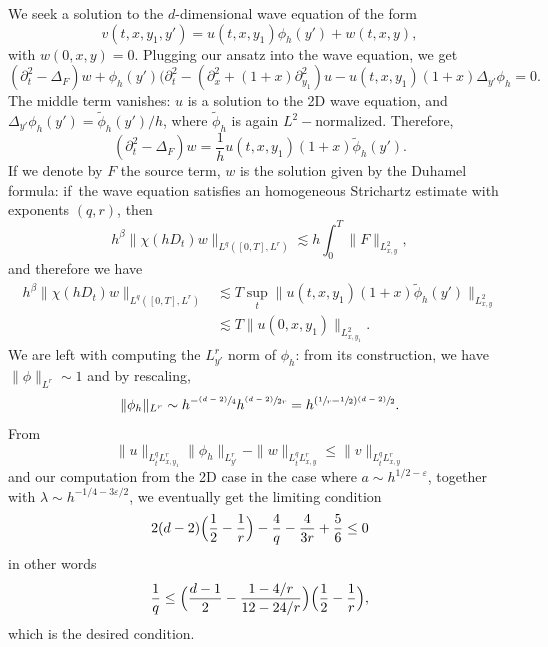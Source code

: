 \documentclass[11pt]{article}
\newcommand{\psfrac}[2]{\sfrac{(#1)}{#2}}
\theoremstyle{plain}
\theoremstyle{definition}
\begin{document}
We seek a solution to the $d$-dimensional wave equation of the form\vspace*{-3pt}
\[
v(t,x,y_{1},y')=u(t,x,y_{1}) \phi_{h}(y')+w(t,x,y),
\]
with $w(0,x,y)=0$. Plugging our ansatz into the wave equation, we get
\[
(\partial_{t}^{2} -\Delta_{F}) w+\phi_{h}(y')(\partial_{t}^{2} -(\partial_{x}^{2}+(1+x)\partial^{2}_{y_{1}}) u -u(t,x,y_{1}) (1+x)\Delta_{y'} \phi_{h}=0.
\]
The middle term vanishes: $u$ is a solution to the 2D wave equation, and $\Delta_{y'} \phi_{h}(y')= \tilde \phi_{h}(y') /h$, where $\tilde \phi_{h}$ is again $L^{2}-$normalized. Therefore,\vspace*{-3pt}
\[
(\partial_{t}^{2} -\Delta_{F}) w= \frac 1 h u(t,x,y_{1}) (1+x)\tilde \phi_{h}(y').
\]
If we denote by $F$ the source term, $w$ is the solution given by the Duhamel formula: if~the wave equation satisfies an homogeneous Strichartz estimate with exponents $(q,r)$, then\vspace*{-3pt}
\begin{equation*}\label{stricrdinhomo}
h^{\beta}\|\chi(hD_t)w\|_{L^q([0,T],
L^r)}\lesssim h \int_{0}^{T}\|F\|_{L^{2}_{x,y}},
\end{equation*}
and therefore we have
\begin{align*}
h^{\beta}\|\chi(hD_t)w\|_{L^q([0,T],
L^r)} & \lesssim T \sup_{t}\| u(t,x,y_{1}) (1+x)\tilde \phi_{h}(y')\|_{L^{2}_{x,y}}\\
& \lesssim T \| u(0,x,y_{1}) \|_{L^{2}_{x,y_{1}}}.
\end{align*}
We are left with computing the $L^{r}_{y'}$ norm of $ \phi_{h}$: from its construction, we have \hbox{$\|\phi\|_{L^{r}}\sim 1$} and by rescaling,
\[
\|\phi_h\|_{L^{r}}\sim h^{-\psfrac{d-2} 4} h^{\psfrac{d-2} {2r}}=h^{(\sfrac{1} {r}-\sfrac 1 2)\psfrac{d-2} 2}.
\]
From
\[
\|u\|_{L^{q}_{t}L^{r}_{x,y_{1}}} \|\phi_{h}\|_{L^{r}_{y'}} -\|w\|_{L^{q}_{t}L^{r}_{x,y}}\leq \|v\|_{L^{q}_{t}L^{r}_{x,y}}
\]
and our computation from the 2D case in the case where $a\sim h^{1/2-\varepsilon}$, together with $\lambda \sim h^{-1/4-3\varepsilon/2}$, we eventually get the limiting condition
\[
2(d-2)\Bigl(\frac 1 2-\frac 1 r\Bigr)- \frac 4{q}-\frac{4}{3r}+\frac 5 6\leq 0
\]
in other words
\[
\frac 1 q \leq \Bigl(\frac {d-1} 2 -\frac {1-4/r}{12-24/r}\Bigr) \Bigl(\frac 1 2 -\frac 1 r\Bigr),
\]
which is the desired condition.
\end{document}

